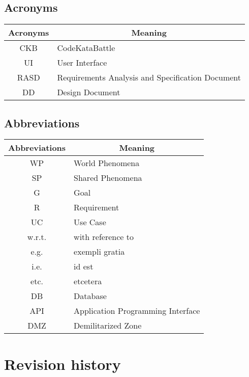 \subsection{Acronyms}
\begin{table}[H]
    \centering
    \begin{tabular}{|c|l|}
    \hline
    \rowcolor[HTML]{B8C8D5} 
    \textbf{Acronyms} & \multicolumn{1}{c|}{\cellcolor[HTML]{B8C8D5}\textbf{Meaning}} \\ \hline
    CKB & CodeKataBattle  \\ \hline
    UI & User Interface  \\ \hline
    RASD & Requirements Analysis and Specification Document  \\ \hline
    DD & Design Document  \\ \hline
    \end{tabular}
\end{table}

\subsection{Abbreviations}
\begin{table}[H]
    \centering
    \begin{tabular}{|c|l|}
    \hline
    \rowcolor[HTML]{B8C8D5} 
    \textbf{Abbreviations} & \multicolumn{1}{c|}{\cellcolor[HTML]{B8C8D5}\textbf{Meaning}} \\ \hline
    WP & World Phenomena  \\ \hline
    SP & Shared Phenomena \\ \hline
    G  & Goal             \\ \hline
    R  & Requirement             \\ \hline
    UC  & Use Case             \\ \hline
    w.r.t. & with reference to \\ \hline
    e.g. & exempli gratia \\ \hline
    i.e. & id est \\ \hline
    etc. & etcetera \\ \hline
    DB & Database \\ \hline
    API & Application Programming Interface \\ \hline
    DMZ & Demilitarized Zone \\ \hline
    \end{tabular}
\end{table}

\section{Revision history}

